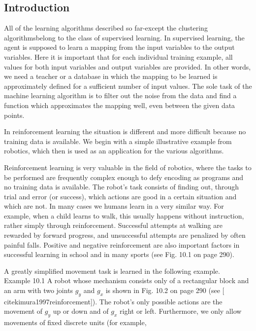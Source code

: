 \documentclass[10pt]{book}
\begin{document}
\subsection*{Introduction}
All of the learning algorithms described so far-except the clustering algorithmsbelong to the class of supervised learning. In supervised learning, the agent is supposed to learn a mapping from the input variables to the output variables. Here it is important that for each individual training example, all values for both input variables and output variables are provided. In other words, we need a teacher or a database in which the mapping to be learned is approximately defined for a sufficient number of input values. The sole task of the machine learning algorithm is to filter out the noise from the data and find a function which approximates the mapping well, even between the given data points.


In reinforcement learning the situation is different and more difficult because no training data is available. We begin with a simple illustrative example from robotics, which then is used as an application for the various algorithms.

Reinforcement learning is very valuable in the field of robotics, where the tasks to be performed are frequently complex enough to defy encoding as programs and no training data is available. The robot's task consists of finding out, through trial and error (or success), which actions are good in a certain situation and which are not. In many cases we humans learn in a very similar way. For example, when a child learns to walk, this usually happens without instruction, rather simply through reinforcement. Successful attempts at walking are rewarded by forward progress, and unsuccessful attempts are penalized by often painful falls. Positive and negative reinforcement are also important factors in successful learning in school and in many sports (see Fig. 10.1 on page 290).

A greatly simplified movement task is learned in the following example.\\
Example 10.1 A robot whose mechanism consists only of a rectangular block and an arm with two joints $g_{y}$ and $g_{x}$ is shown in Fig. 10.2 on page 290 (see [\\cite{kimura1997reinforcement}]). The robot's only possible actions are the movement of $g_{y}$ up or down and of $g_{x}$ right or left. Furthermore, we only allow movements of fixed discrete units (for example,
\end{document}

